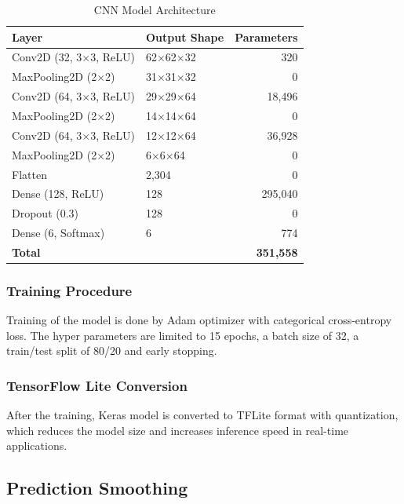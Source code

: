 \documentclass[conference]{IEEEtran}
\begin{document}
\begin{table}[htbp]
\caption{CNN Model Architecture}
\label{tab:model}
\centering
\begin{tabular}{llr}
\toprule
\textbf{Layer} & \textbf{Output Shape} & \textbf{Parameters} \\
\midrule
Conv2D (32, 3$\times$3, ReLU) & 62$\times$62$\times$32 & 320 \\
MaxPooling2D (2$\times$2) & 31$\times$31$\times$32 & 0 \\
Conv2D (64, 3$\times$3, ReLU) & 29$\times$29$\times$64 & 18,496 \\
MaxPooling2D (2$\times$2) & 14$\times$14$\times$64 & 0 \\
Conv2D (64, 3$\times$3, ReLU) & 12$\times$12$\times$64 & 36,928 \\
MaxPooling2D (2$\times$2) & 6$\times$6$\times$64 & 0 \\
Flatten & 2,304 & 0 \\
Dense (128, ReLU) & 128 & 295,040 \\
Dropout (0.3) & 128 & 0 \\
Dense (6, Softmax) & 6 & 774 \\
\midrule
\textbf{Total} & & \textbf{351,558} \\
\bottomrule
\end{tabular}
\end{table}

\subsubsection{Training Procedure}

Training of the model is done by Adam optimizer with categorical cross-entropy loss. The hyper parameters are limited to 15 epochs, a batch size of 32, a train/test split of 80/20 and early stopping.

\subsubsection{TensorFlow Lite Conversion}

After the training, Keras model is converted to TFLite format with quantization, which reduces the model size and increases inference speed in real-time applications.

\subsection{Prediction Smoothing}
\end{document}

